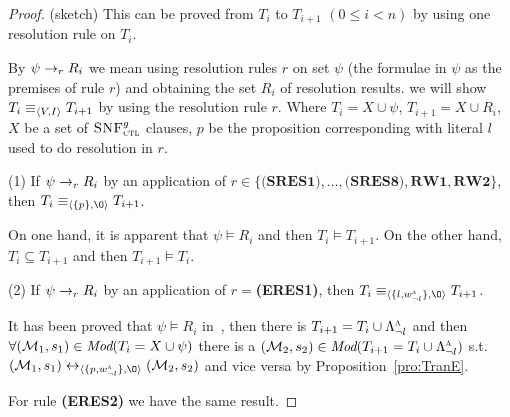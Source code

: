 \documentclass{article}
\begin{document}
\begin{proof}(sketch)
This can be proved from $T_i$ to $T_{i+1}$ $(0\leq i < n)$ by using one resolution rule on $T_i$.


By $\psi \rightarrow_r R_i$ we mean using resolution rules $r$ on set $\psi$ (the formulae in $\psi$ as the premises of rule $r$) and obtaining the set $R_i$ of resolution results.
we will show $T_i \equiv_{{\langle{V,I}\rangle}} T_{i+1}$ by using the resolution rule $r$. Where $T_i= X \cup \psi$, $T_{i+1}=X \cup R_i$, $X$ be a set of ${\textsc{SNF}_{\textsc{ctl}}^g}$ clauses, $p$ be the proposition corresponding with literal $l$ used to do resolution in $r$.

(1) If $\psi \rightarrow_r R_i$ by an application of $r\in \{\textbf{(SRES1)}, \dots, \textbf{(SRES8)}, \textbf{RW1}, \textbf{RW2}\}$, then $T_i \equiv_{\tuple{\{p\}, {\O}}} T_{i+1}$.


On one hand, it is apparent that $\psi \models R_i$ and then $T_i \models T_{i+1}$. On the other hand, $T_i\subseteq T_{i+1}$ and then $T_{i+1} \models T_i$.

(2) If $\psi \rightarrow_r R_i$ by an application of $r=$\textbf{(ERES1)},
then $T_i \equiv_{\tuple{\{l, w_{\neg l}^{\ALL}\}, {\O}}} T_{i+1}$.

It has been proved that $\psi \models R_i$ in~\cite{bolotov2000clausal}, then there is $T_{i+1}=T_i \cup \Lambda_{\neg l}^{\textsc{a}}$ and  then $\forall ({\cal M}_1,s_1) \in \textit{Mod}(T_i= X \cup \psi)$ there is a $({\cal M}_2, s_2)\in \textit{Mod}(T_{i+1}=T_i \cup \Lambda_{\neg l}^{\textsc{a}})$ s.t. $(\Hm_1, s_1) \lrto_{\tuple{\{p, w_{\neg l}^{\ALL}\}, {\O}}} (\Hm_2, s_2)$ and vice versa by Proposition~\ref{pro:TranE}.

For rule \textbf{(ERES2)} we have the same result.

\end{proof}
\end{document}
